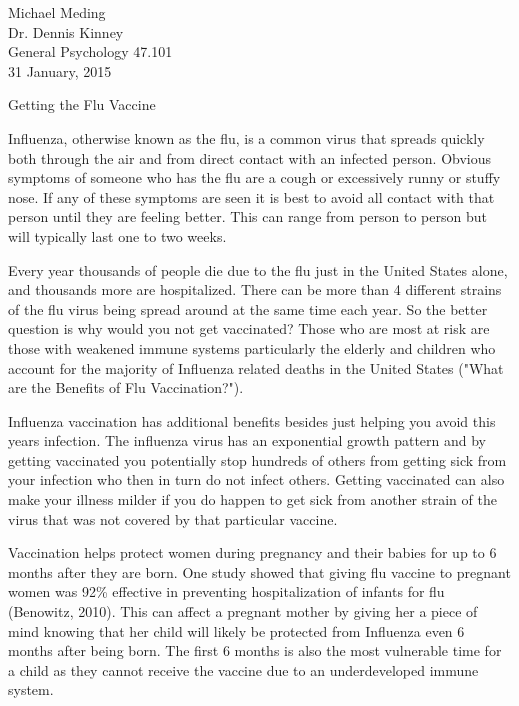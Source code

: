 \documentclass[12pt]{article}
\begin{document}
\begin{flushleft}

Michael Meding\\
Dr. Dennis Kinney\\
General Psychology 47.101\\
31 January, 2015\\


\begin{center}
Getting the Flu Vaccine
\end{center}


\setlength{\parindent}{0.5in}

Influenza, otherwise known as the flu, is a common virus that spreads quickly both through the air and from direct contact with an infected person. Obvious symptoms of someone who has the flu are a cough or excessively runny or stuffy nose. If any of these symptoms are seen it is best to avoid all contact with that person until they are feeling better. This can range from person to person but will typically last one to two weeks.

Every year thousands of people die due to the flu just in the United States alone, and thousands more are hospitalized. There can be more than 4 different strains of the flu virus being spread around at the same time each year. So the better question is why would you not get vaccinated? Those who are most at risk are those with weakened immune systems particularly the elderly and children who account for the majority of Influenza related deaths in the United States ("What are the Benefits of Flu Vaccination?"). 

Influenza vaccination has additional benefits besides just helping you avoid this years infection. The influenza virus has an exponential growth pattern and by getting vaccinated you potentially stop hundreds of others from getting sick from your infection who then in turn do not infect others. Getting vaccinated can also make your illness milder if you do happen to get sick from another strain of the virus that was not covered by that particular vaccine.

Vaccination helps protect women during pregnancy and their babies for up to 6 months after they are born. One study showed that giving flu vaccine to pregnant women was 92\% effective in preventing hospitalization of infants for flu (Benowitz, 2010). This can affect a pregnant mother by giving her a piece of mind knowing that her child will likely be protected from Influenza even 6 months after being born. The first 6 months is also the most vulnerable time for a child as they cannot receive the vaccine due to an underdeveloped immune system. 


\end{flushleft}
\end{document}
